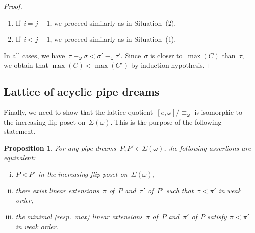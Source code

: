 \documentclass{amsart}
\newtheorem{proposition}[theorem]{Proposition}
\theoremstyle{definition}
\newcommand{\acyclicPipeDreams}{\Sigma} %
\begin{document}
\begin{proof}
\begin{enumerate}[(1)]
\item If~$i = j-1$, we proceed similarly as in Situation~(2).
\item If~$i < j-1$, we proceed similarly as in Situation~(1).
\end{enumerate}
In all cases, we have~$\tau \equiv_\omega \sigma < \sigma' \equiv_\omega \tau'$. Since~$\sigma$ is closer to~$\max(C)$ than~$\tau$, we obtain that ${\max(C) < \max(C')}$ by induction hypothesis.
\end{proof}


\subsection{Lattice of acyclic pipe dreams}
\label{subsec:proofCongruence}

Finally, we need to show that the lattice quotient~$[e,\omega]/\equiv_\omega$ is isomorphic to the increasing flip poset on~$\acyclicPipeDreams(\omega)$. This is the purpose of the following statement.

\begin{proposition}
For any pipe dreams~$P, P' \in \acyclicPipeDreams(\omega)$, the following assertions are equivalent:
\begin{enumerate}[(i)]
\item $P < P'$ in the increasing flip poset on~$\acyclicPipeDreams(\omega)$,
\item there exist linear extensions~$\pi$ of~$P$ and~$\pi'$ of~$P'$ such that~$\pi < \pi'$ in weak order,
\item the minimal (resp.~max) linear extensions~$\pi$ of~$P$ and~$\pi'$ of~$P$ satisfy~$\pi < \pi'$ in weak order.
\end{enumerate}
\end{proposition}
\end{document}
